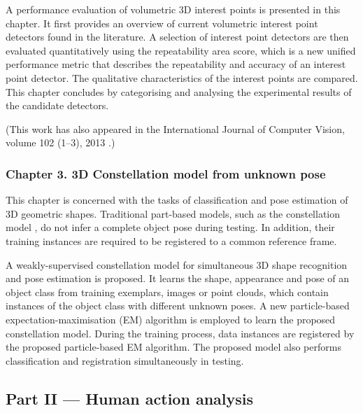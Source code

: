 A performance evaluation of volumetric 3D interest points is presented in this chapter. 
It first provides an overview of current volumetric interest point detectors found in the literature. 
A selection of interest point detectors are then evaluated quantitatively using the repeatability area score, which is a new unified performance metric that describes the repeatability and accuracy of an interest point detector. 
The qualitative characteristics of the interest points are compared.  
This chapter concludes by categorising and analysing the experimental results of the candidate detectors.

(This work has also appeared in the International Journal of Computer Vision, volume 102 (1--3), 2013 \cite{Yu2013a}.)  

\subsubsection*{Chapter 3. 3D Constellation model from unknown pose}

This chapter is concerned with the tasks of classification and pose estimation of 3D geometric shapes. 
Traditional part-based models, such as the constellation model \cite{Weber2000}, do not infer a complete object pose during testing. In addition, their training instances are required to be registered to a common reference frame.

A weakly-supervised constellation model for simultaneous 3D shape recognition and pose estimation is proposed. 
It learns the shape, appearance and pose of an object class from training exemplars, \eg images or point clouds, which contain instances of the object class with different unknown poses. 
A new particle-based expectation-maximisation (EM) algorithm is employed to learn the proposed constellation model. During the training process, data instances are registered by the proposed particle-based EM algorithm.
The proposed model also performs classification and registration simultaneously in testing. 

\subsection*{Part II --- Human action analysis}


